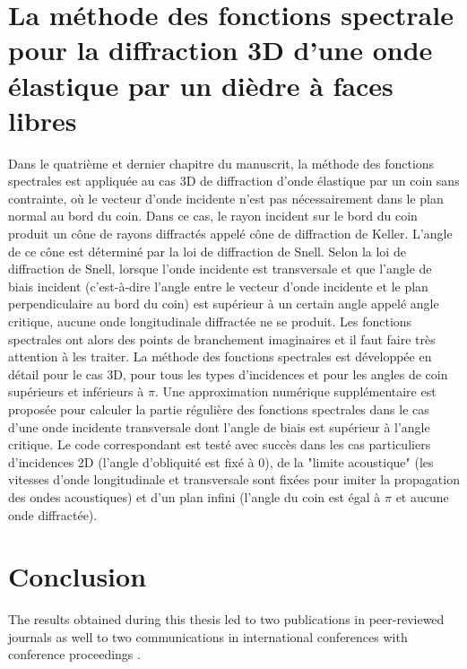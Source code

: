 \section{La méthode des fonctions spectrale pour la diffraction 3D d'une onde élastique par un dièdre à faces libres}

Dans le quatrième et dernier chapitre du manuscrit, la méthode des fonctions spectrales est appliquée au cas 3D de diffraction d'onde élastique par un coin sans contrainte, où le vecteur d'onde incidente n'est pas nécessairement dans le plan normal au bord du coin. Dans ce cas, le rayon incident sur le bord du coin produit un cône de rayons diffractés appelé cône de diffraction de Keller. L'angle de ce cône est déterminé par la loi de diffraction de Snell. Selon la loi de diffraction de Snell, lorsque l'onde incidente est transversale et que l'angle de biais incident (c'est-à-dire l'angle entre le vecteur d'onde incidente et le plan perpendiculaire au bord du coin) est supérieur à un certain angle appelé angle critique, aucune onde longitudinale diffractée ne se produit. Les fonctions spectrales ont alors des points de branchement imaginaires et il faut faire très attention à les traiter. La méthode des fonctions spectrales est développée en détail pour le cas 3D, pour tous les types d'incidences et pour les angles de coin supérieurs et inférieurs à $\pi$. Une approximation numérique supplémentaire est proposée pour calculer la partie régulière des fonctions spectrales dans le cas d'une onde incidente transversale dont l'angle de biais est supérieur à l'angle critique. Le code correspondant est testé avec succès dans les cas particuliers d'incidences 2D (l'angle d'obliquité est fixé à $0$), de la "limite acoustique" (les vitesses d'onde longitudinale et transversale sont fixées pour imiter la propagation des ondes acoustiques) et d'un plan infini (l'angle du coin est égal à $\pi$ et aucune onde diffractée).

\section*{Conclusion}


The results obtained during this thesis led to two publications in peer-reviewed journals \cite{article, articleelasto} as well to two communications in international conferences with conference proceedings \cite{DD2018,AFPAC}.